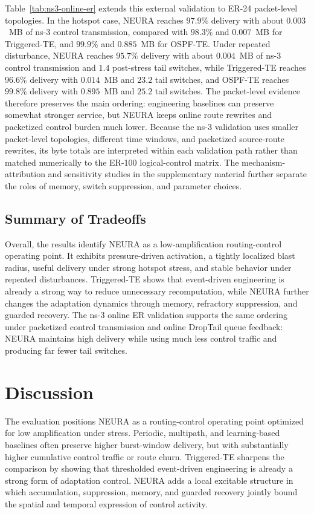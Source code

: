 \documentclass[5p,times]{elsarticle}
\begin{document}
Table~\ref{tab:ns3-online-er} extends this external validation to ER-24 packet-level topologies. In the hotspot case, NEURA reaches $97.9\%$ delivery with about $0.003$~MB of ns-3 control transmission, compared with $98.3\%$ and $0.007$~MB for Triggered-TE, and $99.9\%$ and $0.885$~MB for OSPF-TE. Under repeated disturbance, NEURA reaches $95.7\%$ delivery with about $0.004$~MB of ns-3 control transmission and $1.4$ post-stress tail switches, while Triggered-TE reaches $96.6\%$ delivery with $0.014$~MB and $23.2$ tail switches, and OSPF-TE reaches $99.8\%$ delivery with $0.895$~MB and $25.2$ tail switches. The packet-level evidence therefore preserves the main ordering: engineering baselines can preserve somewhat stronger service, but NEURA keeps online route rewrites and packetized control burden much lower.
Because the ns-3 validation uses smaller packet-level topologies, different time windows, and packetized source-route rewrites, its byte totals are interpreted within each validation path rather than matched numerically to the ER-100 logical-control matrix. The mechanism-attribution and sensitivity studies in the supplementary material further separate the roles of memory, switch suppression, and parameter choices.

\subsection{Summary of Tradeoffs}
Overall, the results identify NEURA as a low-amplification routing-control operating point. It exhibits pressure-driven activation, a tightly localized blast radius, useful delivery under strong hotspot stress, and stable behavior under repeated disturbances. Triggered-TE shows that event-driven engineering is already a strong way to reduce unnecessary recomputation, while NEURA further changes the adaptation dynamics through memory, refractory suppression, and guarded recovery. The ns-3 online ER validation supports the same ordering under packetized control transmission and online DropTail queue feedback: NEURA maintains high delivery while using much less control traffic and producing far fewer tail switches.


\section{Discussion}

The evaluation positions NEURA as a routing-control operating point optimized for low amplification under stress. Periodic, multipath, and learning-based baselines often preserve higher burst-window delivery, but with substantially higher cumulative control traffic or route churn. Triggered-TE sharpens the comparison by showing that thresholded event-driven engineering is already a strong form of adaptation control. NEURA adds a local excitable structure in which accumulation, suppression, memory, and guarded recovery jointly bound the spatial and temporal expression of control activity.
\end{document}
